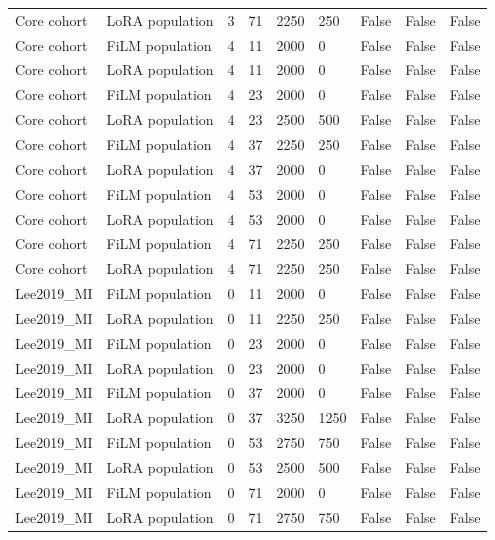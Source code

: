 \begin{longtable}{lllllllll}
Core cohort & LoRA population & 3 & 71 & 2250 & 250 & False & False & False \\
Core cohort & FiLM population & 4 & 11 & 2000 & 0 & False & False & False \\
Core cohort & LoRA population & 4 & 11 & 2000 & 0 & False & False & False \\
Core cohort & FiLM population & 4 & 23 & 2000 & 0 & False & False & False \\
Core cohort & LoRA population & 4 & 23 & 2500 & 500 & False & False & False \\
Core cohort & FiLM population & 4 & 37 & 2250 & 250 & False & False & False \\
Core cohort & LoRA population & 4 & 37 & 2000 & 0 & False & False & False \\
Core cohort & FiLM population & 4 & 53 & 2000 & 0 & False & False & False \\
Core cohort & LoRA population & 4 & 53 & 2000 & 0 & False & False & False \\
Core cohort & FiLM population & 4 & 71 & 2250 & 250 & False & False & False \\
Core cohort & LoRA population & 4 & 71 & 2250 & 250 & False & False & False \\
Lee2019\_\allowbreak{}MI & FiLM population & 0 & 11 & 2000 & 0 & False & False & False \\
Lee2019\_\allowbreak{}MI & LoRA population & 0 & 11 & 2250 & 250 & False & False & False \\
Lee2019\_\allowbreak{}MI & FiLM population & 0 & 23 & 2000 & 0 & False & False & False \\
Lee2019\_\allowbreak{}MI & LoRA population & 0 & 23 & 2000 & 0 & False & False & False \\
Lee2019\_\allowbreak{}MI & FiLM population & 0 & 37 & 2000 & 0 & False & False & False \\
Lee2019\_\allowbreak{}MI & LoRA population & 0 & 37 & 3250 & 1250 & False & False & False \\
Lee2019\_\allowbreak{}MI & FiLM population & 0 & 53 & 2750 & 750 & False & False & False \\
Lee2019\_\allowbreak{}MI & LoRA population & 0 & 53 & 2500 & 500 & False & False & False \\
Lee2019\_\allowbreak{}MI & FiLM population & 0 & 71 & 2000 & 0 & False & False & False \\
Lee2019\_\allowbreak{}MI & LoRA population & 0 & 71 & 2750 & 750 & False & False & False \\

\end{longtable}
